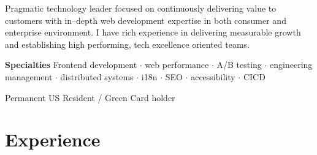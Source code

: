 \documentclass[11pt,a4paper,roman]{moderncv}       %
\begin{document}
\makecvtitle


\small{Pragmatic technology leader focused on continuously delivering value to customers with in--depth web development expertise in both consumer and enterprise environment. I have rich experience in delivering measurable growth and establishing high performing, tech excellence oriented teams.}

\bigskip

\small{\textbf{Specialties} Frontend development ${\cdot}$ web performance ${\cdot}$ A/B testing ${\cdot}$ engineering management ${\cdot}$ distributed systems ${\cdot}$ i18n ${\cdot}$ SEO ${\cdot}$ accessibility ${\cdot}$ CICD}

\bigskip

Permanent US Resident / Green Card holder



\section{Experience}

\end{document}

